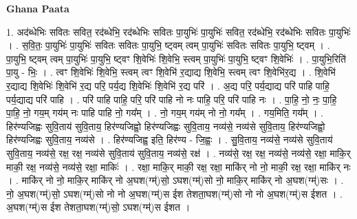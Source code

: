 \documentclass[17pt]{extarticle}
\begin{document}
\textbf{Ghana Paata } \newline

1. अद॑ब्धेभिः सवितः सवित॒ रद॑ब्धेभि॒ रद॑ब्धेभिः सवितः पा॒युभिः॑ पा॒युभिः॑ सवित॒ रद॑ब्धेभि॒ रद॑ब्धेभिः सवितः पा॒युभिः॑ । . स॒वि॒तः॒ पा॒युभिः॑ पा॒युभिः॑ सवितः सवितः पा॒युभि॒ ष्ट्वम् त्वम् पा॒युभिः॑ सवितः सवितः पा॒युभि॒ ष्ट्वम् । . पा॒युभि॒ ष्ट्वम् त्वम् पा॒युभिः॑ पा॒युभि॒ ष्ट्वꣳ शि॒वेभिः॑ शि॒वेभि॒ स्त्वम् पा॒युभिः॑ पा॒युभि॒ ष्ट्वꣳ शि॒वेभिः॑ । . पा॒युभि॒रिति॑ पा॒यु - भिः॒ । . त्वꣳ शि॒वेभिः॑ शि॒वेभि॒ स्त्वम् त्वꣳ शि॒वेभि॑ र॒द्याद्य शि॒वेभि॒ स्त्वम् त्वꣳ शि॒वेभि॑र॒द्य । . शि॒वेभि॑ र॒द्याद्य शि॒वेभिः॑ शि॒वेभि॑ र॒द्य परि॒ पर्य॒द्य शि॒वेभिः॑ शि॒वेभि॑ र॒द्य परि॑ । . अ॒द्य परि॒ पर्य॒द्याद्य परि॑ पाहि पाहि॒ पर्य॒द्याद्य परि॑ पाहि । . परि॑ पाहि पाहि॒ परि॒ परि॑ पाहि नो नः पाहि॒ परि॒ परि॑ पाहि नः । . पा॒हि॒ नो॒ नः॒ पा॒हि॒ पा॒हि॒ नो॒ गय॒म् गय॑म् नः पाहि पाहि नो॒ गय᳚म् । . नो॒ गय॒म् गय॑म् नो नो॒ गय᳚म् । . गय॒मिति॒ गय᳚म् । . हिर॑ण्यजिह्वः सुवि॒ताय॑ सुवि॒ताय॒ हिर॑ण्यजिह्वो॒ हिर॑ण्यजिह्वः सुवि॒ताय॒ नव्य॑से॒ नव्य॑से सुवि॒ताय॒ हिर॑ण्यजिह्वो॒ हिर॑ण्यजिह्वः सुवि॒ताय॒ नव्य॑से । . हिर॑ण्यजिह्व॒ इति॒ हिर॑ण्य - जि॒ह्वः॒ । . सु॒वि॒ताय॒ नव्य॑से॒ नव्य॑से सुवि॒ताय॑ सुवि॒ताय॒ नव्य॑से॒ रक्ष॒ रक्ष॒ नव्य॑से सुवि॒ताय॑ सुवि॒ताय॒ नव्य॑से॒ रक्ष॑ । . नव्य॑से॒ रक्ष॒ रक्ष॒ नव्य॑से॒ नव्य॑से॒ रक्षा॒ माकि॒र् माकी॒ रक्ष॒ नव्य॑से॒ नव्य॑से॒ रक्षा॒ माकिः॑ । . रक्षा॒ माकि॒र् माकी॒ रक्ष॒ रक्षा॒ माकि॑र् नो नो॒ माकी॒ रक्ष॒ रक्षा॒ माकि॑र् नः । . माकि॑र् नो नो॒ माकि॒र् माकि॑र् नो अ॒घश(ग्म्॑)सो॒ ऽघश(ग्म्॑)सो नो॒ माकि॒र् माकि॑र् नो अ॒घश(ग्म्॑)सः । . नो॒ अ॒घश(ग्म्॑)सो॒ ऽघश(ग्म्॑)सो नो नो अ॒घश(ग्म्॑)स ईश तेशता॒घश(ग्म्॑)सो नो नो अ॒घश(ग्म्॑)स ईशत । . अ॒घश(ग्म्॑)स ईश तेशता॒घश(ग्म्॑)सो॒ ऽघश(ग्म्॑)स ईशत । \newline
\end{document}
